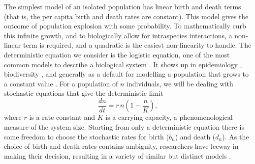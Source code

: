 The simplest model of an isolated population has linear birth and death terms (that is, the per capita birth and death rates are constant).
This model gives the outcome of population explosion with some probability\cite{Nisbet1982}. %
To mathematically curb this infinite growth, and to biologically allow for intraspecies interactions, a non-linear term is required, and a quadratic is the easiest non-linearity to handle.
The deterministic equation we consider is the logistic equation, one of the most common models to describe a biological system \cite{Ovaskainen2010,Wallace2002,Newman2004,Allen2005,Assaf2009}.
It shows up in epidemiology \cite{Assaf2009,Greenhalgh1990}, biodiversity \cite{Hubbell2001,Adler2010,Kessler2007}, and generally as a default for modelling a population that grows to a constant value \cite{Brock2006}. 
For a population of $n$ individuals, we will be dealing with stochastic equations that give the deterministic limit
\begin{equation}
 \frac{dn}{dt} = r\,n\left(1-\frac{n}{K}\right),
 \label{logistic}
\end{equation}
where $r$ is a rate constant and $K$ is a carrying capacity, a phenomenological measure of the system size.
Starting from only a deterministic equation there is some freedom to choose the stochastic rates for birth ($b_n$) and death ($d_n$).
As the choice of birth and death rates contains ambiguity, researchers have leeway in making their decision, resulting in a variety of similar but distinct models \cite{Newman2004,Allen2005,Assaf2009}.

